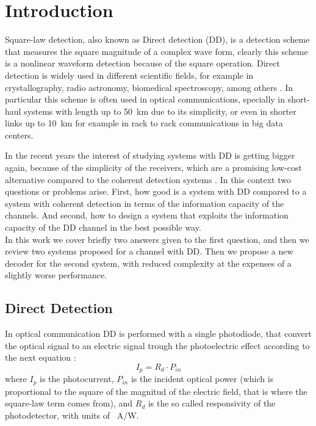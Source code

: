 \chapter{Introduction}
\label{ch:introduction}


	

Square-law detection, also known as Direct detection (DD), is a detection scheme that measures the square magnitude of a complex wave form, clearly this scheme is a nonlinear waveform detection because of the square operation. Direct detection is widely used in different scientific fields, for example in crystallography, radio astronomy, biomedical spectroscopy, among others \cite{Tasbihi_Tukey}. In particular this scheme is often used in optical communications, specially in short-haul systems with length up to \SI{50}{\km} \cite{Agrawal_ch1} due to its simplicity, or even in shorter links up to \SI{10}{\km} for example in rack to rack communications in big data centers.\\

In the recent years the interest of studying systems with DD is getting bigger again, because of the simplicity of the receivers, which are a promising low-cost alternative compared to the coherent detection systems \cite{Mecozzi_2018}. In this context two questions or problems arise. First, how good is a system with DD compared to a system with coherent detection in terms of the information capacity of the channels. And second, how to design a system that exploits the information capacity of the DD channel in the best possible way.\\

In this work we cover briefly two answers given to the first question, and then we review two systems proposed for a channel with DD. Then we propose a new decoder for the second system, with reduced complexity at the expenses of a slightly worse performance.




\section{Direct Detection}
\label{sec:Direct_Detection}

In optical communication DD is performed with a single photodiode, that convert the optical signal to an electric signal trough the photoelectric effect according to the next equation \cite{Agrawal_ch4}:
\begin{equation}
I_p = R_d\cdot P_{in}
\label{eq:photocurrent}
\end{equation}
where $I_p$ is the photocurrent, $P_{in}$ is the incident optical power (which is proportional to the square of the magnitud of the electric field, that is where the square-law term comes from), and $R_d$ is the so called responsivity of the photodetector, with units of \SI{}{\A/\W}.\\

